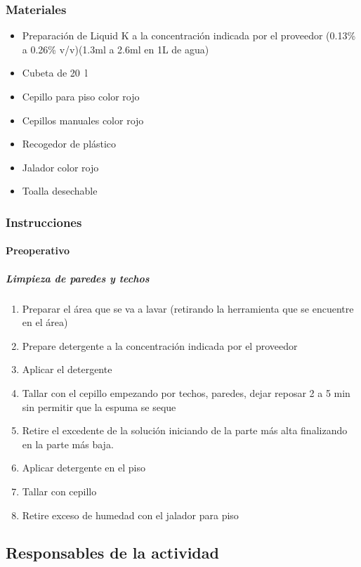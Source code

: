 \subsubsection{Materiales}

\begin{itemize}
	\item Preparación de Liquid K a la concentración indicada por el proveedor (0.13\% a 0.26\% v/v)(1.3ml a 2.6ml en 1L de agua)
	\item Cubeta de \qty{20}{\litre}
	\item Cepillo para piso color rojo
	\item Cepillos manuales color rojo
	\item Recogedor de plástico
	\item Jalador color rojo
	\item Toalla desechable
\end{itemize}

\subsubsection{Instrucciones}

\paragraph{Preoperativo}

\subparagraph{Limpieza de paredes y techos}

\begin{enumerate}
	\item Preparar el área que se va a lavar (retirando la herramienta que se encuentre en el área)
	\item Prepare detergente a la concentración indicada por el proveedor
	\item Aplicar el detergente
	\item Tallar con el cepillo empezando por techos, paredes, dejar reposar 2 a 5 min sin permitir que la espuma se seque
	\item Retire el excedente de la solución iniciando de la parte más alta finalizando en la parte más baja.
	\item Aplicar detergente en el piso
	\item Tallar con cepillo
	\item Retire exceso de humedad con el jalador para piso
\end{enumerate}

\subsection{Responsables de la actividad}

